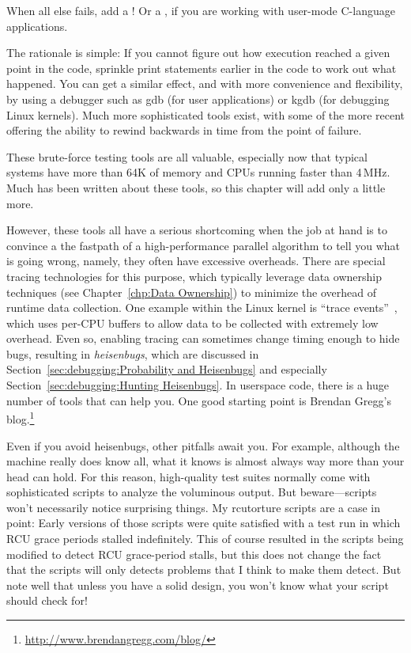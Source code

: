 When all else fails, add a !
Or a , if you are working with user-mode C-language applications.

The rationale is simple: If you cannot figure out how execution reached
a given point in the code, sprinkle print statements earlier in the
code to work out what happened.
You can get a similar effect, and with more convenience and flexibility,
by using a debugger such as gdb (for user applications) or kgdb
(for debugging Linux kernels).
Much more sophisticated tools exist, with some of the more recent
offering the ability to rewind backwards in time from the point
of failure.

These brute-force testing tools are all valuable, especially now
that typical systems have more than 64K of memory and CPUs running
faster than 4\,MHz.
Much has been
written about these tools, so this chapter will add only a little more.

However, these tools all have a serious shortcoming when the job at hand
is to convince a the fastpath of a high-performance parallel algorithm
to tell you what is going wrong, namely, they often have excessive
overheads.
There are special tracing technologies for this purpose, which typically
leverage data ownership techniques
(see Chapter~\ref{chp:Data Ownership})
to minimize the overhead of runtime data collection.
One example within the Linux kernel is
``trace events''~\cite{StevenRostedt2010perfTraceEventP1,StevenRostedt2010perfTraceEventP2,StevenRostedt2010perfTraceEventP3,StevenRostedt2010perfHP+DeathlyMacros},
which uses per-CPU buffers to allow data to be collected with
extremely low overhead.
Even so, enabling tracing can sometimes change timing enough to
hide bugs, resulting in \emph{heisenbugs}, which are discussed in
Section~\ref{sec:debugging:Probability and Heisenbugs}
and especially Section~\ref{sec:debugging:Hunting Heisenbugs}.
In userspace code, there is a huge number of tools that can help you.
One good starting point is Brendan Gregg's blog.\footnote{
	\url{http://www.brendangregg.com/blog/}}

Even if you avoid heisenbugs, other pitfalls await you.
For example, although the machine really does know all,
what it knows is almost always way more than your head can hold.
For this reason, high-quality test suites normally come with sophisticated
scripts to analyze the voluminous output.
But beware---scripts won't necessarily notice surprising things.
My rcutorture scripts are a case in point: Early versions of those
scripts were quite satisfied with a test run in which RCU grace periods
stalled indefinitely.
This of course resulted in the scripts being modified to detect RCU
grace-period stalls, but this does not change the fact that the scripts
will only detects problems that I think to make them detect.
But note well that unless you have a solid design, you won't know what
your script should check for!

